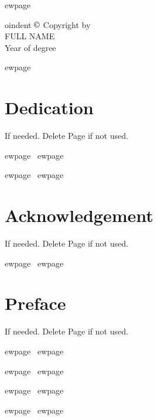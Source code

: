 \documentclass[11pt, twoside]{report}
\begin{document}




ewpage
\hspace{0pt}
\vfill

oindent \Large{$\copyright$ Copyright by \\
FULL NAME\\
Year of degree
}
\vfill
\hspace{0pt}

ewpage

\chapter*{Dedication}
{If needed. Delete Page if not used.}


ewpage \ 
ewpage




ewpage \ 
ewpage

\chapter*{Acknowledgement}
{If needed. Delete Page if not used.}


ewpage \ 
ewpage
\chapter*{Preface}
{If needed. Delete Page if not used.}

\tableofcontents

ewpage \ 
ewpage






ewpage \ 
ewpage

\listoffigures

ewpage \ 
ewpage

\listoftables


ewpage \ 
ewpage









\appendix




\end{document}

